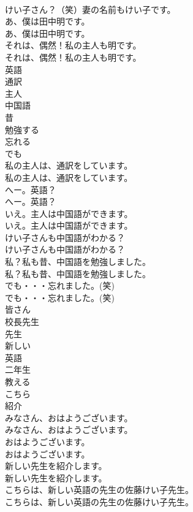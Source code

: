 \documentclass[8pt]{extreport}
\begin{document}
\begin{CJK}{UTF8}{min}
\\	けい子さん？（笑）妻の名前もけい子です。 
\\	あ、僕は田中明です。	
\\	あ、僕は田中明です。 
\\	それは、偶然！私の主人も明です。	
\\	それは、偶然！私の主人も明です。 
\\	英語
\\	通訳
\\	主人
\\	中国語
\\	昔
\\	勉強する
\\	忘れる
\\	でも
\\	私の主人は、通訳をしています。	
\\	私の主人は、通訳をしています。 
\\	へー。英語？	
\\	へー。英語？ 
\\	いえ。主人は中国語ができます。	
\\	いえ。主人は中国語ができます。　 
\\	けい子さんも中国語がわかる？	
\\	けい子さんも中国語がわかる？ 
\\	私？私も昔、中国語を勉強しました。	
\\	私？私も昔、中国語を勉強しました。 
\\	でも・・・忘れました。(笑)	
\\	でも・・・忘れました。(笑) 
\\	皆さん
\\	校長先生
\\	先生
\\	新しい
\\	英語
\\	二年生
\\	教える
\\	こちら
\\	紹介
\\	みなさん、おはようございます。	
\\	みなさん、おはようございます。 
\\	おはようございます。	
\\	おはようございます。 
\\	新しい先生を紹介します。	
\\	新しい先生を紹介します。 
\\	こちらは、新しい英語の先生の佐藤けい子先生。	
\\	こちらは、新しい英語の先生の佐藤けい子先生。 

\end{CJK}
\end{document}
